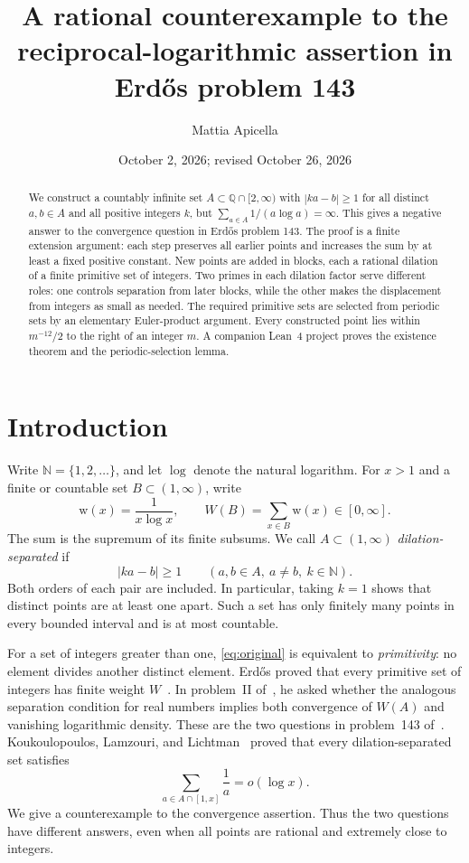 \documentclass[11pt,reqno]{amsart}
\title[A rational counterexample for Erd\H{o}s problem 143]{A rational counterexample to the reciprocal-logarithmic assertion in Erd\H{o}s problem 143}
\author{Mattia Apicella}
\date{October 2, 2026; revised October 26, 2026}
\theoremstyle{definition}
\theoremstyle{remark}
\numberwithin{equation}{section}
\newcommand{\N}{\mathbb N}
\newcommand{\wt}{\mathrm w}
\begin{document}
\begin{abstract}
We construct a countably infinite set $A\subset\mathbb Q\cap[2,\infty)$
with $|ka-b|\geq1$ for all distinct $a,b\in A$ and all positive integers
$k$, but $\sum_{a\in A}1/(a\log a)=\infty$. This gives a negative answer
to the convergence question in Erd\H{o}s problem 143.
The proof is a finite extension argument: each step preserves all earlier
points and increases the sum by at least a fixed positive constant.
New points are added in blocks, each a rational dilation of a finite
primitive set of integers.
Two primes in each dilation factor serve different roles: one controls
separation from later blocks, while the other makes the displacement
from integers as small as needed. The required primitive sets are selected from
periodic sets by an elementary Euler-product argument. Every constructed
point lies within $m^{-12}/2$ to the right of an integer $m$.
A companion Lean~4 project proves the existence theorem and the
periodic-selection lemma.
\end{abstract}
\maketitle

\section{Introduction}
\label{sec:introduction}
Write $\N=\{1,2,\ldots\}$, and let $\log$ denote the natural logarithm.
For $x>1$ and a finite or countable set $B\subset(1,\infty)$, write
\[
 \wt(x)=\frac1{x\log x},\qquad W(B)=\sum_{x\in B}\wt(x)\in[0,\infty].
\]
The sum is the supremum of its finite subsums. We call $A\subset(1,\infty)$
\emph{dilation-separated} if
\begin{equation}\label{eq:original}
 |ka-b|\geq1\qquad(a,b\in A,\ a\ne b,\ k\in\N).
\end{equation}
Both orders of each pair are included. In particular, taking $k=1$
shows that distinct points are at least one apart. Such a set has only
finitely many points in every bounded interval and is at most countable.

For a set of integers greater than one, \eqref{eq:original} is equivalent
to \emph{primitivity}: no element divides another distinct element.
Erd\H{o}s proved that every primitive set of integers has finite
weight $W$~\cite{Erdos1935}. In problem~II of~\cite[p.~692]{Erdos1948},
he asked whether the analogous separation condition for real numbers
implies both convergence of $W(A)$ and vanishing logarithmic density.
These are the two questions in problem~143 of~\cite{Bloom143}.
Koukoulopoulos, Lamzouri, and Lichtman~\cite[Theorem~1]{KLL2025}
proved that every dilation-separated set satisfies
\begin{equation}\label{eq:logdensity}
 \sum_{a\in A\cap[1,x]}\frac1a=o(\log x).
\end{equation}
We give a counterexample to the convergence assertion. Thus the two
questions have different answers, even when all points are rational
and extremely close to integers.
\end{document}

